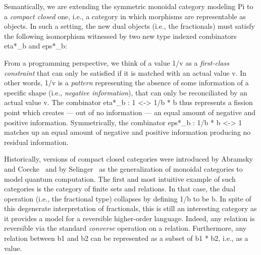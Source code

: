 \documentclass[preprint]{sigplanconf}
\newcommand{\dgm}[2][1.5]{
\begin{center}
\scalebox{#1}{
\texttt{[image: diagrams/\#2.pdf]}
}
\end{center}
}
\begin{document}
Semantically, we are extending the symmetric monoidal category modeling
{{Pi}} to a \emph{compact closed} one, i.e., a category in which morphisms
are representable as objects. In such a setting, the new dual objects (i.e.,
the fractionals) must satisfy the following isomorphism witnessed by two new
type indexed combinators {{eta*_b}} and {{eps*_b}}:
\begin{multicols}{3}
  \dgm{eta_times2}

\columnbreak


\columnbreak

  \dgm{eps_times2}  
\end{multicols}


\vspace{-10pt}
\noindent From a programming perspective, we think of a value {{1/v}} as a
\emph{first-class constraint} that can only be satisfied if it is matched
with an actual value {{v}}. In other words, {{1/v}} is a \emph{pattern} representing the absence of
some information of a specific shape (i.e., \emph{negative information}),
that can only be reconciliated by an actual value {{v}}. The combinator
{{eta*_b : 1 <-> 1/b * b}} thus represents a fission point which creates ---
out of no information --- an equal amount of negative and positive
information. Symmetrically, the combinator {{eps*_b : 1/b * b <-> 1}} matches
up an equal amount of negative and positive information producing no residual
information. 

Historically, versions of compact closed categories were introduced by
Abramsky and Coecke~\cite{Abramsky:2004:CSQ:1018438.1021878} and by
Selinger~\cite{Selinger:2007:DCC:1229185.1229207} as the generalization of
monoidal categories to model quantum computation.  The first and most
intuitive example of such categories is the category of finite sets and
relations. In that case, the dual operation (i.e., the fractional type)
collapses by defining {{1/b}} to be {{b}}. In spite of this degenerate
interpretation of fractionals, this is still an interesting category as it
provides a model for a reversible higher-order language. Indeed, any relation
is reversible via the standard \emph{converse} operation on a relation.
Furthermore, any relation between {{b1}} and {{b2}} can be represented as 
a subset of {{b1 * b2}}, i.e., as a value. 
\end{document}
